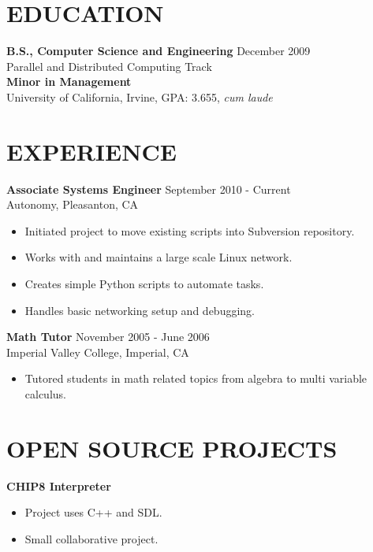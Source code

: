 \documentclass[10pt,line,margin]{res}
\begin{document}
\address{4245 Stanley Blvd, APT 6, Pleasanton, CA}
\address{jobs@apeschel.fastmail.fm or (760)-791-7301}

\begin{resume}
\vfill
\section{EDUCATION}
    {\bf B.S., Computer Science and Engineering} \hfill December 2009 \\
    Parallel and Distributed Computing Track \\
    {\bf Minor in Management} \\
    University of California, Irvine, GPA: 3.655, \textit{cum laude}

\section{EXPERIENCE}
    {\bf Associate Systems Engineer} \hfill September 2010 - Current \\
    Autonomy, Pleasanton, CA
    \begin{itemize} \itemsep -2pt
    \item Initiated project to move existing scripts into Subversion repository.
    \item Works with and maintains a large scale Linux network.
    \item Creates simple Python scripts to automate tasks.
    \item Handles basic networking setup and debugging.
    \end{itemize}

    {\bf Math Tutor} \hfill November 2005 - June 2006 \\
    Imperial Valley College, Imperial, CA
    \begin{itemize} \itemsep -2pt
    \item Tutored students in math related topics from
    algebra to multi variable calculus.
    \end{itemize}

\section {OPEN SOURCE PROJECTS}

    {\bf CHIP8 Interpreter}
    \begin{itemize} \itemsep -2pt
    \item Project uses C++ and SDL.
    \item Small collaborative project.
    \end{itemize}


\end{resume}
\end{document}
